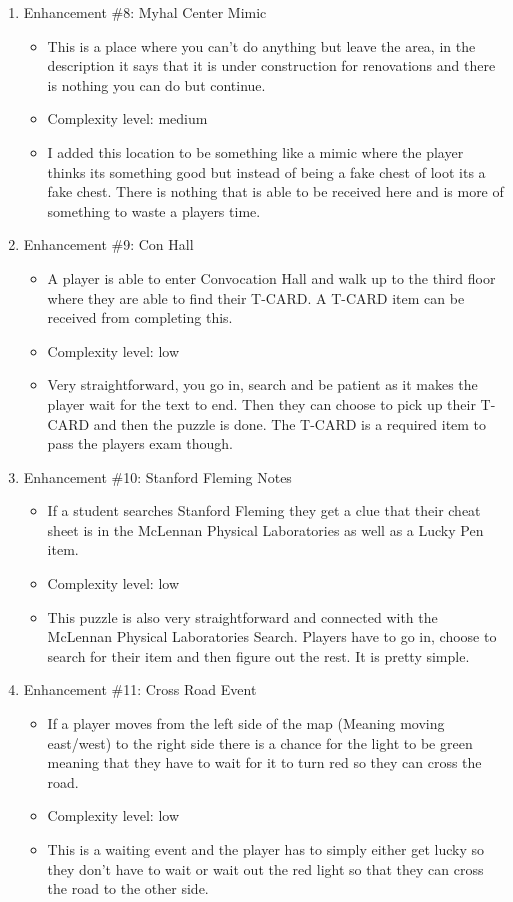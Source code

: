 \documentclass[11pt]{article}
\begin{document}
\begin{enumerate}
\item Enhancement \#8: Myhal Center Mimic
	\begin{itemize}
	\item This is a place where you can't do anything but leave the area, in the description it says that it is under construction for renovations and there is nothing  you can do but continue.
	\item Complexity level: medium
	\item I added this location to be something like a mimic where the player thinks its something good but instead of being a fake chest of loot its a fake chest. There is nothing that is able to be received here and is more of something to waste a players time.
	\end{itemize}

 \item Enhancement \#9: Con Hall
	\begin{itemize}
	\item A player is able to enter Convocation Hall and walk up to the third floor where they are able to find their T-CARD. A T-CARD item can be received from completing this.
	\item Complexity level: low
	\item Very straightforward, you go in, search and be patient as it makes the player wait for the text to end. Then they can choose to pick up their T-CARD and then the puzzle is done. The T-CARD is a required item to pass the players exam though.
    \end{itemize}

 \item Enhancement \#10: Stanford Fleming Notes
	\begin{itemize}
	\item If a student searches Stanford Fleming they get a clue that their cheat sheet is in the McLennan Physical Laboratories as well as a Lucky Pen item. 
	\item Complexity level: low
	\item This puzzle is also very straightforward and connected with the McLennan Physical Laboratories Search. Players have to go in, choose to search for their item and then figure out the rest. It is pretty simple.
	\end{itemize}

 \item Enhancement \#11: Cross Road Event
	\begin{itemize}
	\item If a player moves from the left side of the map (Meaning moving east/west) to the right side there is a chance for the light to be green meaning that they have to wait for it to turn red so they can cross the road.
	\item Complexity level: low
	\item This is a waiting event and the player has to simply either get lucky so they don't have to wait or wait out the red light so that they can cross the road to the other side.
	\end{itemize}


\end{enumerate}
\end{document}
